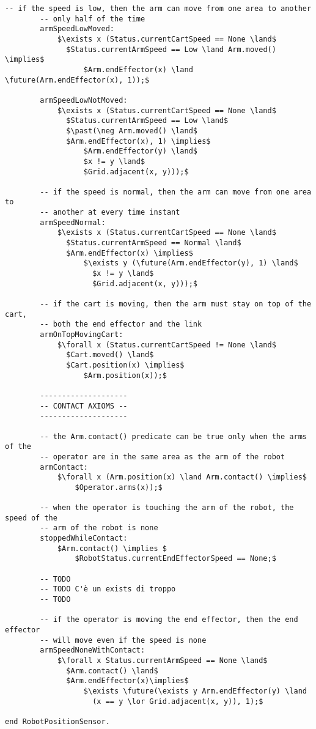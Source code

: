 \begin{lstlisting}[fontadjust, mathescape, frame=single]
        -- if the speed is low, then the arm can move from one area to another
        -- only half of the time
        armSpeedLowMoved: 
            $\exists x (Status.currentCartSpeed == None \land$
              $Status.currentArmSpeed == Low \land Arm.moved() \implies$ 
                  $Arm.endEffector(x) \land \future(Arm.endEffector(x), 1));$

        armSpeedLowNotMoved: 
            $\exists x (Status.currentCartSpeed == None \land$
              $Status.currentArmSpeed == Low \land$ 
              $\past(\neg Arm.moved() \land$
              $Arm.endEffector(x), 1) \implies$ 
                  $Arm.endEffector(y) \land$
                  $x != y \land$ 
                  $Grid.adjacent(x, y)));$

        -- if the speed is normal, then the arm can move from one area to 
        -- another at every time instant
        armSpeedNormal: 
            $\exists x (Status.currentCartSpeed == None \land$
              $Status.currentArmSpeed == Normal \land$
              $Arm.endEffector(x) \implies$
                  $\exists y (\future(Arm.endEffector(y), 1) \land$
                    $x != y \land$
                    $Grid.adjacent(x, y)));$

        -- if the cart is moving, then the arm must stay on top of the cart,
        -- both the end effector and the link
        armOnTopMovingCart: 
            $\forall x (Status.currentCartSpeed != None \land$
              $Cart.moved() \land$ 
              $Cart.position(x) \implies$
                  $Arm.position(x));$

        --------------------
        -- CONTACT AXIOMS --
        --------------------

        -- the Arm.contact() predicate can be true only when the arms of the 
        -- operator are in the same area as the arm of the robot
        armContact:
            $\forall x (Arm.position(x) \land Arm.contact() \implies$
                $Operator.arms(x));$

        -- when the operator is touching the arm of the robot, the speed of the
        -- arm of the robot is none
        stoppedWhileContact:
            $Arm.contact() \implies $
                $RobotStatus.currentEndEffectorSpeed == None;$

        -- TODO
        -- TODO C'è un exists di troppo
        -- TODO
                
        -- if the operator is moving the end effector, then the end effector 
        -- will move even if the speed is none
        armSpeedNoneWithContact: 
            $\forall x Status.currentArmSpeed == None \land$
              $Arm.contact() \land$
              $Arm.endEffector(x)\implies$
                  $\exists \future(\exists y Arm.endEffector(y) \land 
                    (x == y \lor Grid.adjacent(x, y)), 1);$
        
end RobotPositionSensor.
\end{lstlisting}